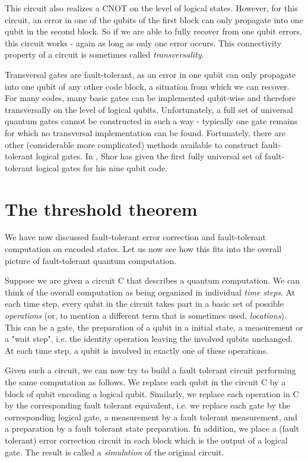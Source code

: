 \documentclass[a4paper, draft]{article}
\theoremstyle{own}
\theoremstyle{remark}
\begin{document}
This circuit also realizes a CNOT on the level of logical states. However, for this circuit, an error in one of the qubits of the first block can only propagate into one qubit in the second block. So if we are able to fully recover from one qubit errors, this circuit works - again as long as only one error occurs. This connectivity property of a circuit is sometimes called \emph{transversality}.

Transversal gates are fault-tolerant, as an error in one qubit can only propagate into one qubit of any other code block, a situation from which we can recover. For many codes, many basic gates can be implemented qubit-wise and therefore transversally on the level of logical qubits. Unfortunately, a full set of universal quantum gates cannot be constructed in such a way - typically one gate remains for which no transversal implementation can be found. Fortunately, there are other (considerable more complicated) methods available to construct fault-tolerant logical gates. In \cite{Shor96}, Shor has given the first fully universal set of fault-tolerant logical gates for his nine qubit code. 




\section{The threshold theorem}



We have now discussed fault-tolerant error correction and fault-tolerant computation on encoded states. Let us now see how this fits into the overall picture of fault-tolerant quantum computation.

Suppose we are given a circuit C that describes a quantum computation. We can think of the overall computation as being organized in individual \emph{time steps}. At each time step, every qubit in the circuit takes part in a basic set of possible \emph{
operations} (or, to mention a different term that is sometimes used, \emph{locations}).
This can be a gate, the preparation of a qubit in a initial state, a measurement or a "wait step", i.e. the identity operation leaving the involved qubits unchanged. At each time step, a qubit is involved in exactly one of these operations.

Given such a circuit, we can now try to build a fault tolerant circuit performing the same computation as follows. We replace each qubit in the circuit C by a block of qubit encoding a logical qubit. Similarly, we replace each operation in C by the corresponding fault tolerant equivalent, i.e. we replace each gate by the corresponding logical gate, a measurement by a fault tolerant measurement, and a preparation by a fault tolerant state preparation. In addition, we place a (fault tolerant) error correction circuit in each block which is the output of a logical gate. The result is called a \emph{simulation} of the original circuit. 
\end{document}
